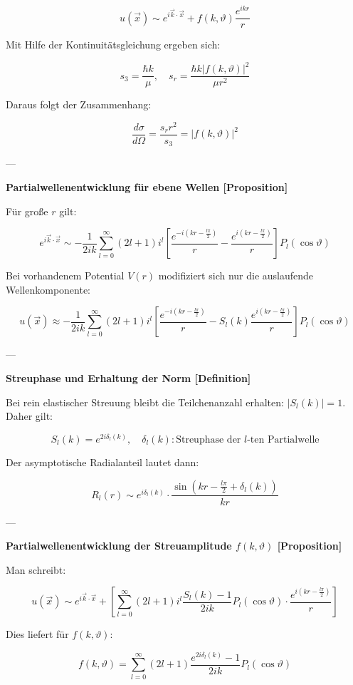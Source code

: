 \documentclass[10pt, letterpaper]{article}
\begin{document}
\[
u(\vec{x}) \sim e^{i \vec{k} \cdot \vec{x}} + f(k, \vartheta) \frac{e^{ikr}}{r}
\]

Mit Hilfe der Kontinuitätsgleichung ergeben sich:

\[
s_3 = \frac{\hbar k}{\mu}, \quad
s_r = \frac{\hbar k |f(k, \vartheta)|^2}{\mu r^2}
\]

Daraus folgt der Zusammenhang:

\[
\frac{d\sigma}{d\Omega} = \frac{s_r r^2}{s_3} = |f(k, \vartheta)|^2
\]

---

\textbf{Partialwellenentwicklung für ebene Wellen [Proposition]}

Für große $r$ gilt:

\[
e^{i \vec{k} \cdot \vec{x}} \sim -\frac{1}{2ik} \sum_{l=0}^{\infty} (2l+1) i^l \left[
\frac{e^{-i(kr - \frac{l\pi}{2})}}{r}
- \frac{e^{i(kr - \frac{l\pi}{2})}}{r}
\right] P_l(\cos \vartheta)
\]

Bei vorhandenem Potential $V(r)$ modifiziert sich nur die auslaufende Wellenkomponente:

\[
u(\vec{x}) \approx -\frac{1}{2ik} \sum_{l=0}^{\infty} (2l+1) i^l \left[
\frac{e^{-i(kr - \frac{l\pi}{2})}}{r}
- S_l(k) \frac{e^{i(kr - \frac{l\pi}{2})}}{r}
\right] P_l(\cos \vartheta)
\]

---

\textbf{Streuphase und Erhaltung der Norm [Definition]}

Bei rein elastischer Streuung bleibt die Teilchenanzahl erhalten: $|S_l(k)| = 1$. Daher gilt:

\[
S_l(k) = e^{2i\delta_l(k)}, \quad \delta_l(k): \text{Streuphase der $l$-ten Partialwelle}
\]

Der asymptotische Radialanteil lautet dann:

\[
R_l(r) \sim e^{i\delta_l(k)} \cdot \frac{\sin(kr - \frac{l\pi}{2} + \delta_l(k))}{kr}
\]

---

\textbf{Partialwellenentwicklung der Streuamplitude $f(k, \vartheta)$ [Proposition]}

Man schreibt:

\[
u(\vec{x}) \sim e^{i \vec{k} \cdot \vec{x}} + \left[
\sum_{l=0}^{\infty} (2l+1) i^l \frac{S_l(k) - 1}{2ik} P_l(\cos \vartheta) \cdot \frac{e^{i(kr - \frac{l\pi}{2})}}{r}
\right]
\]

Dies liefert für $f(k, \vartheta)$:

\[
f(k, \vartheta) = \sum_{l=0}^\infty (2l+1) \frac{e^{2i\delta_l(k)} - 1}{2ik} P_l(\cos \vartheta)
\]
\end{document}
